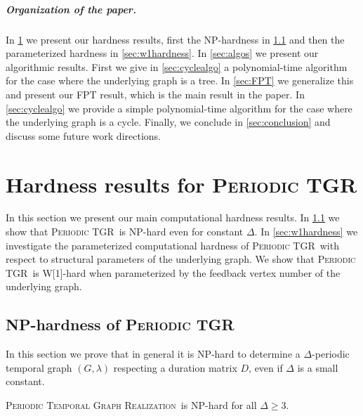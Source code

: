 \documentclass[a4paper,UKenglish,cleveref, autoref, thm-restate]{lipics-v2021}
\newcommand{\NP}{\textrm{NP}}
\newcommand{\deltaExactLong}{\textsc{Periodic Temporal Graph Realization}}
\newcommand{\deltaExact}{\textsc{Periodic TGR}}
\begin{document}
\subparagraph{Organization of the paper.}
In \cref{sec:hardness} we present our hardness results, first the NP-hardness in \cref{sec:nphardness} and then the parameterized hardness in \cref{sec:w1hardness}. In \cref{sec:algos} we present our algorithmic results. First we give in \cref{sec:cyclealgo} a polynomial-time algorithm for the case where the underlying graph is a tree. In \cref{sec:FPT} we generalize this and present our FPT result, which is the main result in the paper. In \cref{sec:cyclealgo} we provide a simple polynomial-time algorithm for the case where the underlying graph is a cycle. Finally, we conclude in \cref{sec:conclusion} and discuss some future work directions.

\section{Hardness results for \deltaExact}\label{sec:hardness}
In this section we present our main computational hardness results. In \cref{sec:nphardness} we show that \deltaExact\ is NP-hard even for constant $\Delta$. In \cref{sec:w1hardness} we investigate the parameterized computational hardness of \deltaExact\ with respect to structural parameters of the underlying graph. We show that \deltaExact\ is W[1]-hard when parameterized by the feedback vertex number of the underlying graph.

\subsection{NP-hardness of \deltaExact}\label{sec:nphardness}
In this section we prove that in general it is NP-hard to determine a $\Delta$-periodic temporal graph $(G,\lambda)$ respecting a duration matrix $D$,
even if $\Delta$ is a small constant.

\begin{theorem}\label{thm:NPhardness}
	\deltaExactLong\ is \NP-hard for all $\Delta \geq 3$.
\end{theorem}
\end{document}
